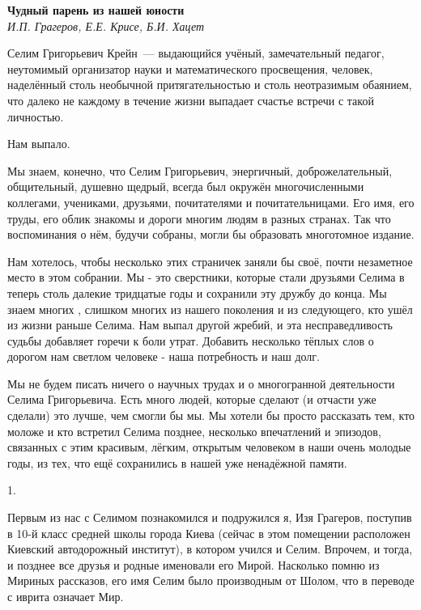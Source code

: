 \begin{center}{ \bf  Чудный парень из нашей юности}\\
{\it И.П. Грагеров, Е.Е. Крисе, Б.И. Хацет } \\
\end{center}

Селим Григорьевич Крейн~--- выдающийся учёный, замечательный педагог,
неутомимый организатор науки и математического просвещения, человек,
наделённый столь не\-о\-бы\-ч\-ной притягательностью и столь неотразимым обаянием,
что далеко не каждому в течение жизни выпадает счастье встречи с такой личностью.

Нам выпало.

Мы знаем, конечно, что Селим Григорьевич, энергичный, доброжелательный, общительный, душевно щедрый, всегда был окружён многочисленными коллегами, учениками, друзьями, почитателями и почитательницами. Его имя, его труды, его облик знакомы и дороги многим людям в разных странах. Так что воспоминания о нём, будучи собраны, могли бы образовать многотомное издание.

Нам хотелось, чтобы несколько этих страничек заняли бы своё, почти незаметное место в этом собрании. Мы - это сверстники, которые стали друзьями Селима в теперь столь далекие тридцатые годы и сохранили эту дружбу до конца. Мы знаем многих , слишком многих из нашего поколения и из следующего, кто ушёл из жизни раньше Селима. Нам выпал другой жребий, и эта несправедливость судьбы добавляет горечи к боли утрат. Добавить несколько тёплых слов о дорогом нам светлом человеке - наша потребность и наш долг.

Мы не будем писать ничего о научных трудах и о многогранной деятельности Селима Григорьевича. Есть много людей, которые сделают (и отчасти уже сделали) это лучше, чем смогли бы мы. Мы хотели бы просто рассказать тем, кто моложе и кто встретил Селима позднее, несколько впечатлений и эпизодов, связанных с этим красивым, лёгким, открытым человеком в наши очень молодые годы, из тех, что ещё сохранились в нашей уже ненадёжной памяти.

1.

Первым из нас с Селимом познакомился и подружился я, Изя Грагеров,
поступив в 10-й класс средней школы города Киева (сейчас в этом помещении расположен Киевский автодорожный институт),
в котором учился и Селим.
Впрочем, и тогда, и позднее все друзья и родные именовали его Мирой.
Насколько помню из Мириных рассказов, его имя Селим было производным от Шолом, что в переводе с иврита означает Мир.

